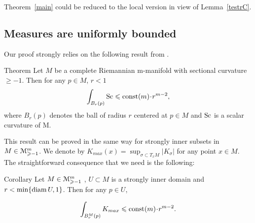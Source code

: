 Theorem~\ref{main} could be reduced to the local version
in view of Lemma~\ref{testrC}.


\subsection{Measures are uniformly bounded}
Our proof strongly relies on the following result from
\cite{petrunin-SC}.
\begin{thm}{Theorem}\label{scPet}
Let $M$ be a complete Riemannian m-manifold with sectional
curvature $ \ge -1$. Then for any $p \in M$, $r<1$
$$\int_{B_r(p)} \Sc\le \const(m)\cdot r^{m-2},$$
where $B_r(p)$ denotes the ball of radius $r$ centered at $p\in M$ and $\operatorname{Sc}$ is a scalar curvature
of M.
\end{thm}

This result can be proved in the same way for
strongly inner subsets in $M\in\mathcal M_{\geqslant -1}^m$.
We denote by $K_{max}(x)=\sup_{\sigma\subset T_xM} |K_\sigma|$
for any point $x\in M$.
The straightforward consequence that we need is the following:

\begin{thm}{Corollary}\label{Kbound}
Let $M\in\mathcal M_{\geqslant -1}^m$ ,
$U\subset M$ is a strongly inner domain and
 $r<\min\{\operatorname{diam} U, 1\}$.
 Then for any $p\in U$,

$$\int_{B_r^M(p)} K_{max}\le \const(m)\cdot r^{m-2}.$$


\end{thm}






